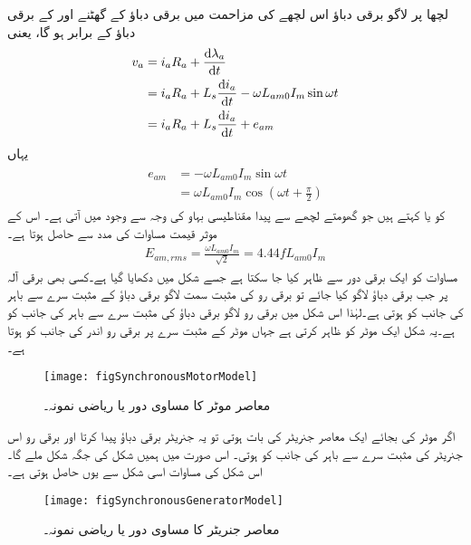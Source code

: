لچھا  پر لاگو برقی دباؤ اس لچھے کی مزاحمت  میں برقی دباؤ کے گھٹنے اور  کے برقی دباؤ کے برابر ہو گا، یعنی
\begin{gather}
\begin{aligned}\label{مساوات_معاصر_دباؤ_مساوی_مزاحمت_گھتاو_اور_پیدا_دباؤ}
v_a&=i_a R_a+\frac{\dif \lambda_a}{\dif t}\\
&=i_a R_a+L_s \frac{\dif i_a}{\dif t}-\omega L_{am0} I_m \sin \omega t\\
&=i_a R_a+L_s \frac{\dif i_a}{\dif t}+e_{am}
\end{aligned}
\end{gather}
یہاں
\begin{gather}
\begin{aligned}
e_{am}&=-\omega L_{am0} I_m \sin \omega t\\
&=\omega L_{am0} I_m \cos \left (\omega t+\frac{\pi}{2} \right)
\end{aligned}
\end{gather}
کو  یا  کہتے ہیں جو گھومتے لچھے سے پیدا مقناطیسی بہاو کی وجہ سے وجود میں آتی ہے۔  اس کے موثر قیمت  مساوات   کی مدد سے حاصل ہوتا ہے۔
\begin{align}\label{مساوات_معاصر_موثر_پیدا_دباؤ}
E_{am,rms}=\frac{\omega L_{am0} I_m}{\sqrt{2}}=4.44 f L_{am0} I_m
\end{align}
مساوات   کو ایک برقی دور سے ظاہر کیا جا سکتا ہے جسے شکل   میں دکھایا گیا ہے۔کسی بھی برقی آلہ پر جب برقی دباؤ لاگو کیا جائے تو برقی رو کی مثبت سمت لاگو برقی دباؤ کے مثبت سرے سے باہر کی جانب کو ہوتی ہے۔لہٰذا اس شکل میں برقی رو  لاگو برقی دباؤ  کی مثبت سرے سے باہر کی جانب کو ہے۔یہ شکل ایک موٹر کو ظاہر کرتی ہے جہاں موٹر کے مثبت سرے پر برقی رو اندر کی جانب کو ہوتا ہے۔
\begin{figure}
\centering
\texttt{[image: figSynchronousMotorModel]}
\caption{معاصر موٹر کا مساوی دور یا ریاضی نمونہ۔}
\label{شکل_معاصر_موٹر_کا_مساوی_دور}
\end{figure}
اگر موٹر کی بجائے ایک معاصر جنریٹر کی بات ہوتی تو یہ جنریٹر برقی دباؤ پیدا کرتا اور برقی رو اس جنریٹر کی مثبت سرے سے باہر کی جانب کو ہوتی۔ اس صورت میں ہمیں شکل   کی جگہ شکل   ملے گا۔اس شکل کی مساوات اسی شکل سے یوں حاصل ہوتی ہے۔
\begin{figure}
\centering
\texttt{[image: figSynchronousGeneratorModel]}
\caption{معاصر جنریٹر کا مساوی دور یا ریاضی نمونہ۔}
\label{شکل_معاصر_جنریٹر_کا_مساوی_دور}
\end{figure}

